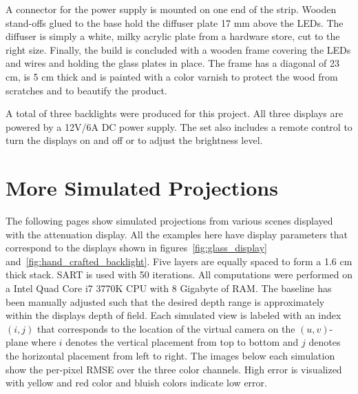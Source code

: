 A connector for the power supply is mounted on one end of the strip.
Wooden stand-offs glued to the base hold the diffuser plate 17 mm above the LEDs.
The diffuser is simply a white, milky acrylic plate from a hardware store, cut to the right size.
Finally, the build is concluded with a wooden frame covering the LEDs and wires and holding the glass plates in place.
The frame has a diagonal of 23 cm, is 5 cm thick and is painted with a color varnish to protect the wood from scratches and to beautify the product.

A total of three backlights were produced for this project.
All three displays are powered by a 12V/6A DC power supply.
The set also includes a remote control to turn the displays on and off or to adjust the brightness level.

\section{More Simulated Projections}
\label{sec:simulated_projections}

The following pages show simulated projections from various scenes displayed with the attenuation display.
All the examples here have display parameters that correspond to the displays shown in figures~\ref{fig:glass_display} and~\ref{fig:hand_crafted_backlight}.
Five layers are equally spaced to form a 1.6 cm thick stack.
\mbox{SART} is used with 50 iterations.
All computations were performed on a Intel Quad Core i7 3770K CPU with 8 Gigabyte of RAM.
The baseline has been manually adjusted such that the desired depth range is approximately within the displays depth of field.
Each simulated view is labeled with an index $(i, j)$ that corresponds to the location of the virtual camera on the \mbox{$(u, v)$-plane} where $i$ denotes the vertical placement from top to bottom and $j$ denotes the horizontal placement from left to right.
The images below each simulation show the per-pixel \mbox{RMSE} over the three color channels.
High error is visualized with yellow and red color and bluish colors indicate low error.

